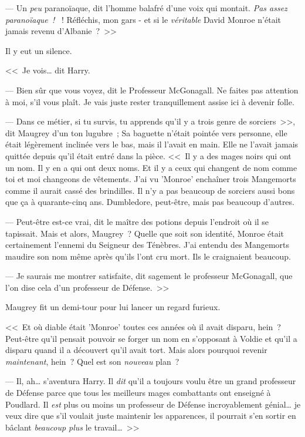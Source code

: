 --- Un \emph{peu} paranoïaque, dit l'homme balafré d'une voix qui montait. \emph{Pas assez paranoïaque~! }~! Réfléchis, mon gars - et si le \emph{véritable} David Monroe n'était jamais revenu d'Albanie~?~>>

Il y eut un silence.

<<~Je vois… dit Harry.

--- Bien sûr que vous voyez, dit le Professeur McGonagall. Ne faites pas attention à moi, s'il vous plaît. Je vais juste rester tranquillement assise ici à devenir folle.

--- Dans ce métier, si tu survis, tu apprends qu'il y a trois genre de sorciers~>>, dit Maugrey d'un ton lugubre~; Sa baguette n'était pointée vers personne, elle était légèrement inclinée vers le bas, mais il l'avait en main. Elle ne l'avait jamais quittée depuis qu'il était entré dans la pièce. <<~Il y a des mages noirs qui ont un nom. Il y en a qui ont deux noms. Et il y a ceux qui changent de nom comme toi et moi changeons de vêtements. J'ai vu 'Monroe' enchaîner trois Mangemorts comme il aurait cassé des brindilles. Il n'y a pas beaucoup de sorciers aussi bons que ça à quarante-cinq ans. Dumbledore, peut-être, mais pas beaucoup d'autres.

--- Peut-être est-ce vrai, dit le maître des potions depuis l'endroit où il se tapissait. Mais et alors, Maugrey~? Quelle que soit son identité, Monroe était certainement l'ennemi du Seigneur des Ténèbres. J'ai entendu des Mangemorts maudire son nom même après qu'ils l'ont cru mort. Ils le craignaient beaucoup.

--- Je saurais me montrer satisfaite, dit sagement le professeur McGonagall, que l'on dise cela d'un professeur de Défense.~>>

Maugrey fit un demi-tour pour lui lancer un regard furieux.

<<~Et où diable était 'Monroe' toutes ces années où il avait disparu, hein~? Peut-être qu'il pensait pouvoir se forger un nom en s'opposant à Voldie et qu'il a disparu quand il a découvert qu'il avait tort. Mais alors pourquoi revenir \emph{maintenant}, hein~? Quel est son \emph{nouveau} plan~?

--- Il, ah… s'aventura Harry. Il \emph{dit} qu'il a toujours voulu être un grand professeur de Défense parce que tous les meilleurs mages combattants ont enseigné à Poudlard. Il \emph{est} plus ou moins un professeur de Défense incroyablement génial… je veux dire que s'il voulait juste maintenir les apparences, il pourrait s'en sortir en bâclant \emph{beaucoup plus} le travail…~>>

